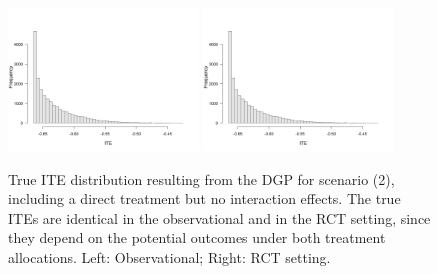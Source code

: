 \begin{figure}[htbp]
\centering
\includegraphics[width=0.45\textwidth]{img/results/observ_scenario2_ite_distribution_dgp.png}
\includegraphics[width=0.45\textwidth]{img/results/rct_scenario2_ite_distribution_dgp.png}
\caption{True ITE distribution resulting from the DGP for scenario (2), including a direct treatment but no interaction effects. The true ITEs are identical in the observational and in the RCT setting, since they depend on the potential outcomes under both treatment allocations. Left: Observational; Right: RCT setting.}
\label{fig:scenario2_ite_distribution_dgp}
\end{figure}



